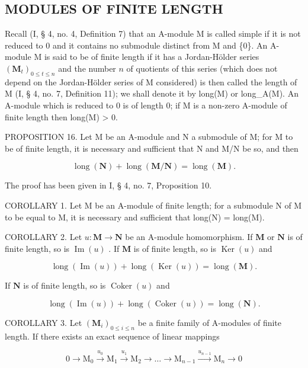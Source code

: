 \subsection{MODULES OF FINITE LENGTH}

Recall (I, § 4, no. 4, Definition 7) that an A-module M is called simple if it is not reduced to 0 and it contains no submodule distinct from M and \{0\}. An A-module M is said to be of finite length if it has a Jordan-Hölder series \((\mathbf{M}_t)_{0 \leqslant t \leqslant n}\) and the number \(n\) of quotients of this series (which does not depend on the Jordan-Hölder series of M considered) is then called the length of M (I, § 4, no. 7, Definition 11); we shall denote it by long(M) or long\_A(M). An A-module which is reduced to 0 is of length 0; if M is a non-zero A-module of finite length then long(M) \textgreater{} 0.

PROPOSITION 16. Let M be an A-module and N a submodule of M; for M to be of finite length, it is necessary and sufficient that N and M/N be so, and then

\[
\operatorname{long} (\mathbf {N}) + \operatorname{long} (\mathbf {M} / \mathbf {N}) = \operatorname{long} (\mathbf {M}).\tag{34}
\]

The proof has been given in I, § 4, no. 7, Proposition 10.

COROLLARY 1. Let M be an A-module of finite length; for a submodule N of M to be equal to M, it is necessary and sufficient that long(N) = long(M).

COROLLARY 2. Let \(u: \mathbf{M} \to \mathbf{N}\) be an A-module homomorphism. If \(\mathbf{M}\) or \(\mathbf{N}\) is of finite length, so is \(\operatorname{Im}(u)\) . If \(\mathbf{M}\) is of finite length, so is \(\operatorname{Ker}(u)\) and

\[
\operatorname{long} (\operatorname{Im} (u)) + \operatorname{long} (\operatorname{Ker} (u)) = \operatorname{long} (\mathbf {M}).\tag{35}
\]

If \(\mathbf{N}\) is of finite length, so is \(\operatorname{Coker}(u)\) and

\[
\operatorname{long} (\operatorname{Im} (u)) + \operatorname{long} (\operatorname{Coker} (u)) = \operatorname{long} (\mathbf {N}).\tag{36}
\]

COROLLARY 3. Let \((\mathbf{M}_i)_{0\leqslant i\leqslant n}\) be a finite family of A-modules of finite length. If there exists an exact sequence of linear mappings

\[
0 \longrightarrow \mathrm{M} _ {0} \stackrel {u _ {0}} {\longrightarrow} \mathrm{M} _ {1} \stackrel {u _ {1}} {\longrightarrow} \mathrm{M} _ {2} \longrightarrow \dots \longrightarrow \mathrm{M} _ {n - 1} \stackrel {u _ {n - 1}} {\longrightarrow} \mathrm{M} _ {n} \longrightarrow 0\tag{37}
\]

